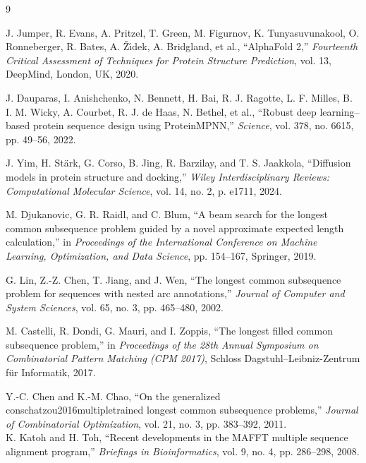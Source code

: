 \documentclass[runningheads]{llncs}
\begin{document}
 

\newpage
	 \begin{thebibliography}{9}
	 	
	 	J. Jumper, R. Evans, A. Pritzel, T. Green, M. Figurnov, K. Tunyasuvunakool,
	 	O. Ronneberger, R. Bates, A. {\v{Z}}{\'\i}dek, A. Bridgland, et al.,
	 	``AlphaFold 2,''
	 	\textit{Fourteenth Critical Assessment of Techniques for Protein Structure Prediction},
	 	vol. 13, DeepMind, London, UK, 2020.
	 	
	 	J. Dauparas, I. Anishchenko, N. Bennett, H. Bai, R. J. Ragotte,
	 	L. F. Milles, B. I. M. Wicky, A. Courbet, R. J. de Haas,
	 	N. Bethel, et al.,
	 	``Robust deep learning--based protein sequence design using ProteinMPNN,''
	 	\textit{Science}, vol. 378, no. 6615, pp. 49--56, 2022.
	 	
	 	J. Yim, H. St{\"a}rk, G. Corso, B. Jing, R. Barzilay, and T. S. Jaakkola,
	 	``Diffusion models in protein structure and docking,''
	 	\textit{Wiley Interdisciplinary Reviews: Computational Molecular Science},
	 	vol. 14, no. 2, p. e1711, 2024.
	 	
	 	M. Djukanovic, G. R. Raidl, and C. Blum,
	 	``A beam search for the longest common subsequence problem guided by a novel approximate expected length calculation,''
	 	in \textit{Proceedings of the International Conference on Machine Learning, Optimization, and Data Science},
	 	pp. 154--167, Springer, 2019.
	 	
	 	G. Lin, Z.-Z. Chen, T. Jiang, and J. Wen,
	 	``The longest common subsequence problem for sequences with nested arc annotations,''
	 	\textit{Journal of Computer and System Sciences},
	 	vol. 65, no. 3, pp. 465--480, 2002.
	 	
	 	M. Castelli, R. Dondi, G. Mauri, and I. Zoppis,
	 	``The longest filled common subsequence problem,''
	 	in \textit{Proceedings of the 28th Annual Symposium on Combinatorial Pattern Matching (CPM 2017)},
	 	Schloss Dagstuhl--Leibniz-Zentrum f{\"u}r Informatik, 2017.
	 	
	 	Y.-C. Chen and K.-M. Chao,
	 	``On the generalized conschatzou2016multipletrained longest common subsequence problems,''
	 	\textit{Journal of Combinatorial Optimization},
	 	vol. 21, no. 3, pp. 383--392, 2011.
	 	\\
	 	K. Katoh and H. Toh,
	 	``Recent developments in the MAFFT multiple sequence alignment program,''
	 	\textit{Briefings in Bioinformatics},
	 	vol. 9, no. 4, pp. 286--298, 2008.
	 	

\end{thebibliography}
\end{document}
